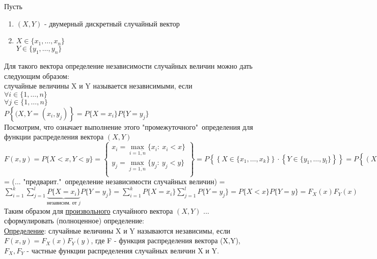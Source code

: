 
Пусть 
\begin{enumerate}
\item[1)] $(X,Y)$ - двумерный дискретный случайный вектор

\item[2)] $X \in \{x_1, \ldots, x_n\}$ \\
$Y \in \{y_1, \ldots, y_n\}$ \\
\end{enumerate}
Для такого вектора определение независимости случайных величин можно дать следующим образом: \\
случайные величины X и Y называется независимыми, если \\
$\forall i \in \{1, \ldots, n\}$ \\
$\forall j \in \{1, \ldots, n\}$ \\
$P\left\{ (X,Y = (x_i, y_j) \right\} = P\{X = x_i\} P\{Y = y_j\}$ \\
Посмотрим, что означает выполнение этого "промежуточного"\ определения для функции распределения вектора $(X,Y)$ \\
$F(x,y) = P\{X < x, Y < y\} = 
\left\{ \begin{array}{lll}
	x_i = \max\limits_{i = \overline{1,n}} \{x_i: \ x_i < x\} \\
	y_j = \max\limits_{j = \overline{1,n}} \{y_j: \ y_j < y\} \\
\end{array} \right\} = 
P\left\{ \left\{ X \in \{x_1, \ldots, x_k\} \right\} \cdot \left\{ Y \in \{y_1, \ldots, y_l\} \right\} \right\} = 
P\left\{ (X,Y) = \{x_i, y_j\}, \ i = \overline{1,k}, \ j = \overline{1,l} \right\} = 
\sum\limits_{i = 1}^{k} \sum\limits_{i = 1}^{l} p\left\{ (X,Y) = (x_i, y_j) \right\}$ = 
(... "предварит."\ определение независимости случайных величин) = 
$\sum\limits_{i = 1}^{k} \sum\limits_{j = 1}^{l} \underbrace{P\{X = x_i\}}_{\text{независим. от } j} P\{Y = y_j\} = 
\sum\limits_{i = 1}^{k} P\{X = x_i\} \sum\limits_{j = 1}^{l} P\{Y = y_j\} = P\{X < x\} P\{Y = y\} = F_X (x) F_Y (x)$ \\
Таким образом для \underline{произвольного} случайного вектора $(X,Y)$ ... сформулировать (полноценное) определение: \\
\underline{Определение}: случайные величины X и Y называются независимы, если \\
$F(x,y) = F_X (x) F_Y (y)$, где F - функция распределения вектора (X,Y), $F_X, F_Y$ - частные функции распределения случайных величин X и Y. \\



